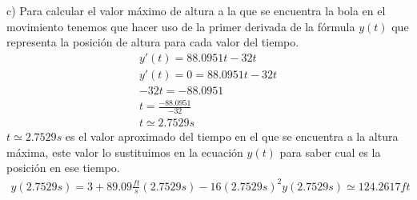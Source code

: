     \vspace{5mm} %
    
    c) Para calcular el valor máximo de altura a la que se encuentra la bola en el movimiento tenemos que hacer uso de la primer derivada de la fórmula $y(t)$ que representa la posición de altura para cada valor del tiempo.
    \begin{gather*}
        y'(t)=88.0951t-32t\\
        y'(t)=0=88.0951t-32t\\
        -32t=-88.0951\\
        t=\frac{-88.0951}{-32}\\
        t\simeq 2.7529s
    \end{gather*}
    $t\simeq 2.7529s$ es el valor aproximado del tiempo en el que se encuentra a la altura máxima, este valor lo sustituimos en la ecuación $y(t)$ para saber cual es la posición en ese tiempo.
    \begin{gather*}
        y(2.7529s)=3+89.09\frac{ft}{s}(2.7529s)-16(2.7529s)^2
        y(2.7529s)\simeq 124.2617ft
    \end{gather*}